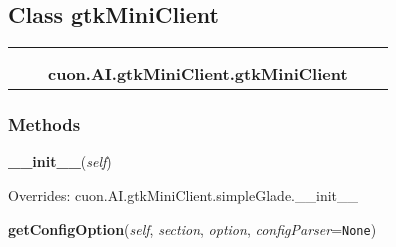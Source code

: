 \subsection{Class gtkMiniClient}

    \label{cuon:AI:gtkMiniClient:gtkMiniClient}
\begin{tabular}{cccccc}
\multicolumn{2}{r}{\settowidth{\BCL}{cuon.AI.gtkMiniClient.simpleGlade}\multirow{2}{\BCL}{cuon.AI.gtkMiniClient.simpleGlade}}
&&
  \\\cline{3-3}
  &&\multicolumn{1}{c|}{}
&&
  \\
&&\multicolumn{2}{l}{\textbf{cuon.AI.gtkMiniClient.gtkMiniClient}}
\end{tabular}



  \subsubsection{Methods}

    \vspace{0.5ex}

\hspace{.8\funcindent}\begin{boxedminipage}{\funcwidth}

    \raggedright \textbf{\_\_init\_\_}(\textit{self})

\setlength{\parskip}{2ex}
\setlength{\parskip}{1ex}
      Overrides: cuon.AI.gtkMiniClient.simpleGlade.\_\_init\_\_

    \end{boxedminipage}

    \label{cuon:AI:gtkMiniClient:gtkMiniClient:getConfigOption}

    \vspace{0.5ex}

\hspace{.8\funcindent}\begin{boxedminipage}{\funcwidth}

    \raggedright \textbf{getConfigOption}(\textit{self}, \textit{section}, \textit{option}, \textit{configParser}={\tt None})

\setlength{\parskip}{2ex}
\setlength{\parskip}{1ex}
    \end{boxedminipage}

